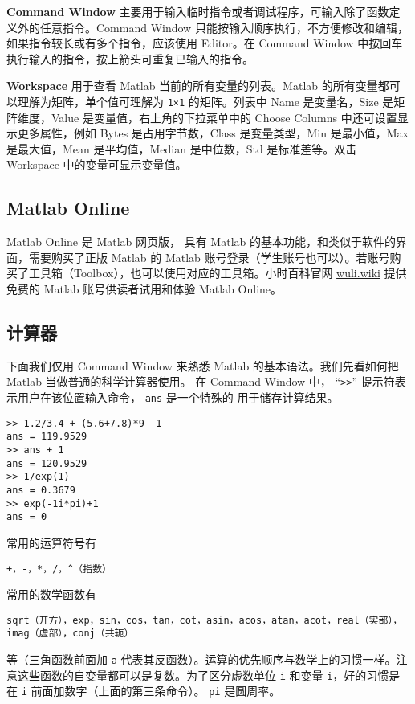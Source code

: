 \textbf{Command Window} 主要用于输入临时指令或者调试程序，可输入除了函数定义外的任意指令。Command Window 只能按输入顺序执行，不方便修改和编辑，如果指令较长或有多个指令，应该使用 Editor。在 Command Window 中按回车执行输入的指令，按上箭头可重复已输入的指令。

\textbf{Workspace} 用于查看 Matlab 当前的所有变量的列表。Matlab 的所有变量都可以理解为矩阵，单个值可理解为 \verb|1×1| 的矩阵。列表中 Name 是变量名，Size 是矩阵维度，Value 是变量值，右上角的下拉菜单中的 Choose Columns 中还可设置显示更多属性，例如 Bytes 是占用字节数，Class 是变量类型，Min 是最小值，Max 是最大值，Mean 是平均值，Median 是中位数，Std 是标准差等。双击 Workspace 中的变量可显示变量值。

\subsection{Matlab Online}
Matlab Online 是 Matlab 网页版， 具有 Matlab 的基本功能，和类似于软件的界面，需要购买了正版 Matlab 的 Matlab 账号登录（学生账号也可以）。若账号购买了工具箱（Toolbox），也可以使用对应的工具箱。小时百科官网 \href{https://wuli.wiki}{wuli.wiki} 提供免费的 Matlab 账号供读者试用和体验 Matlab Online。

\subsection{计算器}
下面我们仅用 Command Window 来熟悉 Matlab 的基本语法。我们先看如何把 Matlab 当做普通的科学计算器使用。 在 Command Window 中， “\verb|>>|” 提示符表示用户在该位置输入命令， \verb|ans| 是一个特殊的 用于储存计算结果。
\begin{lstlisting}[language=matlabC]
>> 1.2/3.4 + (5.6+7.8)*9 -1
ans = 119.9529
>> ans + 1
ans = 120.9529
>> 1/exp(1)
ans = 0.3679
>> exp(-1i*pi)+1
ans = 0
\end{lstlisting}
常用的运算符号有
\begin{lstlisting}[language=matlabC]
+，-，*，/，^（指数）
\end{lstlisting}
常用的数学函数有
\begin{lstlisting}[language=matlabC]
sqrt（开方），exp，sin，cos，tan，cot，asin，acos，atan，acot，real（实部），imag（虚部），conj（共轭）
\end{lstlisting}
等（三角函数前面加 \verb|a| 代表其反函数）。运算的优先顺序与数学上的习惯一样。注意这些函数的自变量都可以是复数。为了区分虚数单位 \verb|i| 和变量 \verb|i|，好的习惯是在 \verb|i| 前面加数字（上面的第三条命令）。 \verb|pi| 是圆周率。

